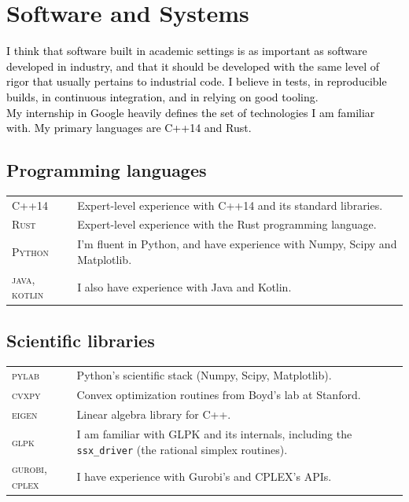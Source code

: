 \documentclass[10PT,letter]{article}
\newcommand{\subsectionstyle}[1]{\normalfont\selectfont\textcolor{titlecol}{\sffamily #1}}
\newcommand{\numbox}[1]{} %
\begin{document}
    \section*{\numbox{9}\bfseries\textcolor{titlecol}{\sffamily Software and Systems}}
        \textcolor{black}{I think that software built in academic settings is as important as software developed in industry, and that it should be developed with the same level of rigor that usually pertains to industrial code.
        I believe in tests, in reproducible builds, in continuous integration, and in relying on good tooling.}\\[-2mm]
        
        \noindent\textcolor{black}{My internship in Google heavily defines the set of technologies I am familiar with. My primary languages are C++14 and Rust.}
        \vspace{2mm}
        
        \subsection*{\subsectionstyle{Programming languages}}
            \begin{tabular}{p{1in}p{5.55in}}
                \textsc{C++14} & Expert-level experience with C++14 and its standard libraries.\\[.5mm]
                \textsc{Rust} & Expert-level experience with the Rust programming language.\\[.5mm]
                \textsc{Python} & I'm fluent in Python, and have experience with Numpy, Scipy and Matplotlib.\\[.5mm]
                \textsc{java, kotlin} & I also have experience with Java and Kotlin.
            \end{tabular}

        \subsection*{\subsectionstyle{Scientific libraries}}
            \begin{tabular}{p{1in}p{5.55in}}
                \textsc{pylab} & Python's scientific stack (Numpy, Scipy, Matplotlib).\\[.5mm]
                \textsc{cvxpy} & Convex optimization routines from Boyd's lab at Stanford.\\[.5mm]
                \textsc{eigen} & Linear algebra library for C++.\\[.5mm]
                \textsc{glpk} & I am familiar with GLPK and its internals, including the \texttt{ssx\_driver} (the rational simplex routines).\\[.5mm]
                \textsc{gurobi, cplex} & I have experience with Gurobi's and CPLEX's APIs.
            \end{tabular}
\end{document}
